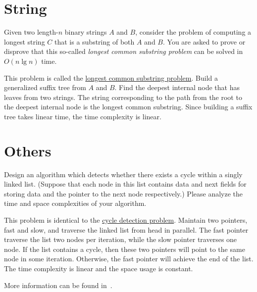 \section{String}
\begin{Exercise}[title={Longest common substring problem},origin={NTU CSIE 97},difficulty=1]
Given two length-$n$ binary strings $A$ and $B$, consider the problem of computing a longest string $C$ that is a substring of both $A$ and $B$. You are asked to prove or disprove that this so-called \emph{longest common substring problem} can be solved in $O(n \lg n)$ time.
\end{Exercise}
\begin{Answer}
This problem is called the \href{https://en.wikipedia.org/wiki/Longest_common_substring_problem}{longest common substring problem}. Build a generalized suffix tree from $A$ and $B$. Find the deepest internal node that has leaves from two strings. The string corresponding to the path from the root to the deepest internal node is the longest common substring. Since building a suffix tree takes linear time, the time complexity is linear.
\end{Answer}

\section{Others}
\begin{Exercise}[title={Cycle detection problem},origin={MCU CSIE 95}]
Design an algorithm which detects whether there exists a cycle within a singly linked list. (Suppose that each node in this list contains data and next fields for storing data and the pointer to the next node respectively.) Please analyze the time and space complexities of your algorithm.
\end{Exercise}
\begin{Answer}
This problem is identical to the \href{https://en.wikipedia.org/wiki/Cycle_detection}{cycle detection problem}. Maintain two pointers, fast and slow, and traverse the linked list from head in parallel. The fast pointer traverse the list two nodes per iteration, while the slow pointer traverses one node. If the list contains a cycle, then these two pointers will point to the same node in some iteration. Otherwise, the fast pointer will achieve the end of the list. The time complexity is linear and the space usage is constant.

\begin{remark}
More information can be found in~\cite{Nesterenko2012}.
\end{remark}
\end{Answer}

